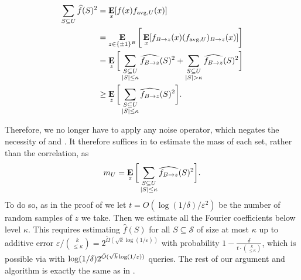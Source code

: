 \documentclass[10pt,a4paper]{article}
\theoremstyle{plain}
\theoremstyle{remark}
\theoremstyle{plain}
\providecommand{\E}{}
\renewcommand{\E}{\mathop{\bf E\/}}
\newcommand{\eps}{\varepsilon}
\renewcommand{\hat}{\widehat}
\renewcommand{\tilde}{\widetilde}
\newcommand{\calS}{\mathcal{S}}
\newcommand{\avg}{\operatorname{avg}}
\newcommand{\InfluentialCoords}{\calS}
\newcommand{\BooleanHypercube}[1]{\{\pm 1\}^{#1}}
\newcommand{\fourierCutoff}{\kappa}
\begin{document}
\begin{align*}
    \sum_{S \subseteq U}\hat{f}(S)^2 &= \E_x[f(x)f_{\avg, U}(x)] \\
    &= \E_{z\in \BooleanHypercube{B}} \bigg [ \E_x[f_{B\to z}(x)(f_{\avg, U})_{B \to z}(x)]\bigg]\\
    &= \E_z \bigg [  \sum_{\substack{S \subseteq U \\ |S| \leq \fourierCutoff}}\hat{f_{B\to z}}(S)^2 + \sum_{\substack{S \subseteq U \\ |S| > \fourierCutoff}}\hat{f_{B\to z}}(S)^2\bigg ]\\
    &\geq \E_z \bigg [  \sum_{\substack{S \subseteq U \\ |S| \leq \fourierCutoff}}\hat{f_{B\to z}}(S)^2 \bigg ]. 
\end{align*}

Therefore, we no longer have to apply any noise operator, which negates the necessity of  and . It therefore suffices in  to estimate the mass of each set, rather than the correlation, as 
$$m_U =\E_z \bigg [  \sum_{\substack{S \subseteq U \\ |S| \leq \fourierCutoff}}\hat{f_{B\to z}}(S)^2 \bigg ].$$
To do so, as in the proof of  we let $t = O(\log(1/\delta)/\eps^2)$ be the number of random samples of $z$ we take. Then we estimate all the Fourier coefficients below level $\fourierCutoff$. This requires estimating $\hat{f}(S)$ for all $S \subseteq\InfluentialCoords$ of size at most $\fourierCutoff$ up to additive error $\eps/\binom{k}{\leq \kappa} = 2^{\tilde{\Omega}(\sqrt{k}\log(1/\eps))}$ with probability $1-\frac{\delta}{t\cdot \binom{k}{\leq \kappa}}$, which is possible via  with $\log(1/\delta)2^{\Tilde{O}(\sqrt{k}\log(1/\eps))}$ queries. The rest of our argument and algorithm is exactly the same as in .
\end{document}
